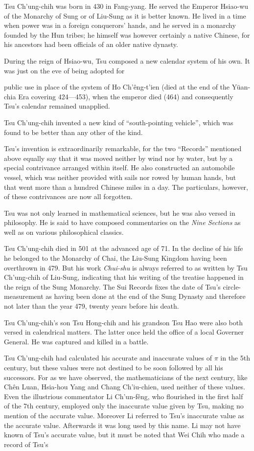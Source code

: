 \documentclass[11pt]{article}
\newcommand{\scanpage}[2]{\clearpage\setcounter{footnote}{0}\noindent{\footnotesize\color{gray}PDF page #1 · #2}\par\medskip}
\newcommand{\scanfooter}{}
\begin{document}
Tsu Ch'ung-chih was born in 430 in Fang-yang. He served the Emperor Hsiao-wu of the Monarchy of Sung or of Liu-Sung as it is better known. He lived in a time when power was in a foreign conquerors' hands, and he served in a monarchy founded by the Hun tribes; he himself was however certainly a native Chinese, for his ancestors had been officials of an older native dynasty.

During the reign of Hsiao-wu, Tsu composed a new calendar system of his own. It was just on the eve of being adopted for
\scanfooter

\scanpage{0066}{Chapter 7, printed page 52}
public use in place of the system of Ho Ch'êng-t'ien (died at the end of the Yüan-chia Era covering 424---453), when the emperor died (464) and consequently Tsu's calendar remained unapplied.

Tsu Ch'ung-chih invented a new kind of ``south-pointing vehicle'', which was found to be better than any other of the kind.

Tsu's invention is extraordinarily remarkable, for the two ``Records'' mentioned above equally say that it was moved neither by wind nor by water, but by a special contrivance arranged within itself. He also constructed an automobile vessel, which was neither provided with sails nor rowed by human hands, but that went more than a hundred Chinese miles in a day. The particulars, however, of these contrivances are now all forgotten.

Tsu was not only learned in mathematical sciences, but he was also versed in philosophy. He is said to have composed commentaries on the \emph{Nine Sections} as well as on various philosophical classics.

Tsu Ch'ung-chih died in 501 at the advanced age of 71. In the decline of his life he belonged to the Monarchy of Chai, the Liu-Sung Kingdom having been overthrown in 479. But his work \emph{Chui-shu} is always referred to as written by Tsu Ch'ung-chih of Liu-Sung, indicating that his writing of the treatise happened in the reign of the Sung Monarchy. The Sui Records fixes the date of Tsu's circle-measurement as having been done at the end of the Sung Dynasty and therefore not later than the year 479, twenty years before his death.

Tsu Ch'ung-chih's son Tsu Hong-chih and his grandson Tsu Hao were also both versed in calendrical matters. The latter once held the office of a local Governer General. He was captured and killed in a battle.

Tsu Ch'ung-chih had calculated his accurate and inaccurate values of $\pi$ in the 5th century, but these values were not destined to be soon followed by all his successors. For as we have observed, the mathematicians of the next century, like Chên Luan, Hsia-hou Yang and Chang Ch'iu-chien, used neither of these values. Even the illustrious commentator Li Ch'un-fêng, who flourished in the first half of the 7th century, employed only the inaccurate value given by Tsu, making no mention of the accurate value. Moreover Li referred to Tsu's inaccurate value as the accurate value. Afterwards it was long used by this name. Li may not have known of Tsu's accurate value, but it must be noted that Wei Chih who made a record of Tsu's
\scanfooter
\end{document}
